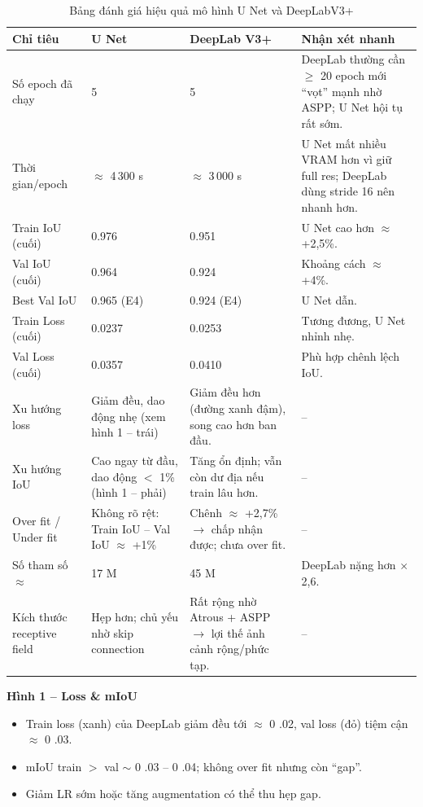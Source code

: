 \documentclass[12pt]{report}
\begin{document}
\begin{table}[h!]
\centering
\renewcommand{\arraystretch}{1.25}
\setlength{\tabcolsep}{4pt}
\begin{tabular}{|p{3.3cm}|p{1.7cm}|p{2.1cm}|p{5.2cm}|}
\hline
\textbf{Chỉ tiêu} & \textbf{U Net} & \textbf{DeepLab V3+} & \textbf{Nhận xét nhanh} \\
\hline
Số epoch đã chạy & 5 & 5 & DeepLab thường cần $\geq$ 20 epoch mới “vọt” mạnh nhờ ASPP; U Net hội tụ rất sớm. \\
\hline
Thời gian/epoch & $\approx$ 4\,300 s & $\approx$ 3\,000 s & U Net mất nhiều VRAM hơn vì giữ full res; DeepLab dùng stride 16 nên nhanh hơn. \\
\hline
Train IoU (cuối) & 0.976 & 0.951 & U Net cao hơn $\approx$ +2,5\%. \\
\hline
Val IoU (cuối) & 0.964 & 0.924 & Khoảng cách $\approx$ +4\%. \\
\hline
Best Val IoU & 0.965 (E4) & 0.924 (E4) & U Net dẫn. \\
\hline
Train Loss (cuối) & 0.0237 & 0.0253 & Tương đương, U Net nhỉnh nhẹ. \\
\hline
Val Loss (cuối) & 0.0357 & 0.0410 & Phù hợp chênh lệch IoU. \\
\hline
Xu hướng loss & Giảm đều, dao động nhẹ (xem hình 1 – trái) & Giảm đều hơn (đường xanh đậm), song cao hơn ban đầu. & -- \\
\hline
Xu hướng IoU & Cao ngay từ đầu, dao động $<$ 1\% (hình 1 – phải) & Tăng ổn định; vẫn còn dư địa nếu train lâu hơn. & -- \\
\hline
Over fit / Under fit & Không rõ rệt: Train IoU – Val IoU $\approx$ +1\% & Chênh $\approx$ +2,7\% $\rightarrow$ chấp nhận được; chưa over fit. & -- \\
\hline
Số tham số $\approx$ & 17 M & 45 M & DeepLab nặng hơn $\times$2,6. \\
\hline
Kích thước receptive field & Hẹp hơn; chủ yếu nhờ skip connection & Rất rộng nhờ Atrous + ASPP $\rightarrow$ lợi thế ảnh cảnh rộng/phức tạp. & -- \\
\hline
\end{tabular}
\caption{Bảng đánh giá hiệu quả mô hình U Net và DeepLabV3+}
\end{table}

\vspace{0.5cm}

\textbf{Hình 1 – Loss \& mIoU}

\begin{itemize}
    \item Train loss (xanh) của DeepLab giảm đều tới $\approx$ 0 .02, val loss (đỏ) tiệm cận $\approx$ 0 .03.
    \item mIoU train $>$ val $\sim$ 0 .03 – 0 .04; không over fit nhưng còn “gap”.
    \item Giảm LR sớm hoặc tăng augmentation có thể thu hẹp gap.
\end{itemize}
\end{document}
